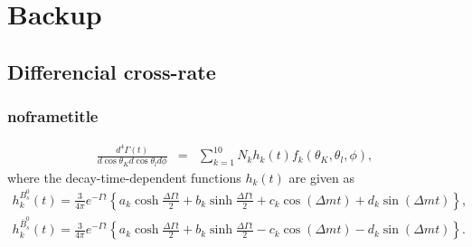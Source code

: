 \documentclass[aspectratio=169,9pt,handout]{beamer}
\begin{document}
\section*{Backup}


\subsection*{Differencial cross-rate}
\begin{frame}[default] %
\frametitle{noframetitle}

\begin{eqnarray*}
  \frac{d^4 \Gamma( t) }{ d\cos\theta_K d\cos\theta_l d\phi}&=&  \sum_{k=1}^{10} N_k h_k(t) f_k(\theta_K, \theta_l, \phi),  
  \end{eqnarray*}
 where the decay-time-dependent functions $h_k(t)$ are given as
 \begin{eqnarray*}
  h_k^{B_s^0}(t)= \frac{3}{ 4\pi}
    e^{-\Gamma t}\left\{ a_k \cosh\frac{\Delta \Gamma t}{2} + b_k \sinh\frac{\Delta \Gamma t}{2} + c_k \cos(\Delta mt)  +  d_k \sin(\Delta mt) \right\}, \\
  h_k^{\overline{B}_s^0}(t)= \frac{3}{ 4\pi}
    e^{-\Gamma t}\left\{ a_k \cosh\frac{\Delta \Gamma t}{2} + b_k \sinh\frac{\Delta \Gamma t}{2} - c_k \cos(\Delta mt)  -  d_k \sin(\Delta mt) \right\}.
 \end{eqnarray*}
 

\end{frame} %
\end{document}
